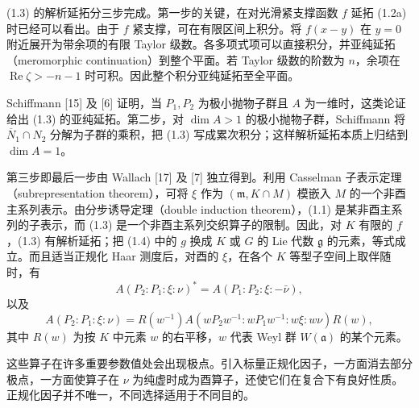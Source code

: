 (1.3) 的解析延拓分三步完成。第一步的关键，在对光滑紧支撑函数 $f$ 延拓 (1.2a) 时已经可以看出。由于 $f$ 紧支撑，可在有限区间上积分。将 $f(x-y)$ 在 $y=0$ 附近展开为带余项的有限 Taylor 级数。各多项式项可以直接积分，并亚纯延拓（meromorphic continuation）到整个平面。若 Taylor 级数的阶数为 $n$，余项在 $\operatorname{Re}\zeta>-n-1$ 时可积。因此整个积分亚纯延拓至全平面。

Schiffmann [15] 及 [6] 证明，当 $P_1,P_2$ 为极小抛物子群且 $A$ 为一维时，这类论证给出 (1.3) 的亚纯延拓。第二步，对 $\dim A>1$ 的极小抛物子群，Schiffmann 将 $\overline N_1\cap N_2$ 分解为子群的乘积，把 (1.3) 写成累次积分；这样解析延拓本质上归结到 $\dim A=1$。

第三步即最后一步由 Wallach [17] 及 [7] 独立得到。利用 Casselman 子表示定理（subrepresentation theorem），可将 $\xi$ 作为 $(\mathfrak m,K\cap M)$ 模嵌入 $M$ 的一个非酉主系列表示。由分步诱导定理（double induction theorem），(1.1) 是某非酉主系列的子表示，而 (1.3) 是一个非酉主系列交织算子的限制。因此，对 $K$ 有限的 $f$，(1.3) 有解析延拓；把 (1.4) 中的 $g$ 换成 $K$ 或 $G$ 的 Lie 代数 $\mathfrak g$ 的元素，等式成立。而且适当正规化 Haar 测度后，对酉的 $\xi$，在各个 $K$ 等型子空间上取伴随时，有
\begin{equation}
 A(P_2:P_1:\xi:\nu)^*=A(P_1:P_2:\xi:-\bar\nu),
 \tag{1.6}
\end{equation}
以及
\[
 A(P_2:P_1:\xi:\nu)=R(w^{-1})
 A(wP_2w^{-1}:wP_1w^{-1}:w\xi:w\nu)R(w),
\]
其中 $R(w)$ 为按 $K$ 中元素 $w$ 的右平移，$w$ 代表 Weyl 群 $W(\mathfrak a)$ 的某个元素。

这些算子在许多重要参数值处会出现极点。引入标量正规化因子，一方面消去部分极点，一方面使算子在 $\nu$ 为纯虚时成为酉算子，还使它们在复合下有良好性质。正规化因子并不唯一，不同选择适用于不同目的。

